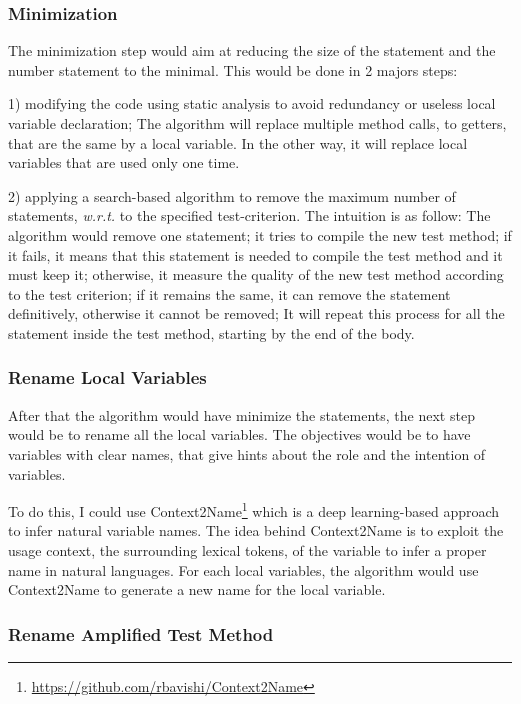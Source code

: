 \subsubsection{Minimization}
\label{subsubsec:conclusion:short-prespectives:prettifier:miminize}
The minimization step would aim at reducing the size of the statement and the number statement to the minimal.
This would be done in 2 majors steps:

1) modifying the code using static analysis to avoid redundancy or useless local variable declaration;
The algorithm will replace multiple method calls, \eg to getters, that are the same by a local variable.
In the other way, it will replace local variables that are used only one time.

2) applying a search-based algorithm to remove the maximum number of statements, \emph{w.r.t.} to the specified test-criterion.
The intuition is as follow:
The algorithm would remove one statement;
it tries to compile the new test method;
if it fails, it means that this statement is needed to compile the test method and it must keep it;
otherwise, it measure the quality of the new test method according to the test criterion;
if it remains the same, it can remove the statement definitively, otherwise it cannot be removed;
It will repeat this process for all the statement inside the test method, starting by the end of the body.

\subsubsection{Rename Local Variables}
\label{subsubsec:conclusion:short-prespectives:prettifier:rename-local}

After that the algorithm would have minimize the statements, the next step would be to rename all the local variables.
The objectives would be to have variables with clear names, that give hints about the role and the intention of variables.

To do this, I could use Context2Name\footnote{\url{https://github.com/rbavishi/Context2Name}}\cite{DBLP:journals/corr/abs-1809-05193} which is a deep learning-based approach to infer natural variable names.
The idea behind Context2Name is to exploit the usage context, \ie the surrounding lexical tokens, of the variable to infer a proper name in natural languages.
For each local variables, the algorithm would use Context2Name to generate a new name for the local variable.


\subsubsection{Rename Amplified Test Method}
\label{subsubsec:conclusion:short-prespectives:prettifier:rename-method}

